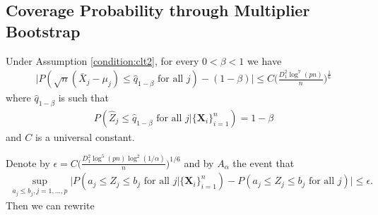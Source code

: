 \documentclass[mnsc,blindrev]{informs4} %
\begin{document}
\subsection{Coverage Probability through Multiplier Bootstrap}\label{multiplier bootstrap:unnormalized and normalized}
\begin{theorem}\label{consistency:unnormalized}
Under Assumption \ref{condition:clt2}, for every $0<\beta<1$ we have
\begin{align*}
\lvert P(\sqrt n(\bar{X}_j-\mu_j)\leq \hat q_{1-\beta}\text{ for all }j)- (1-\beta)\rvert\leq C\Big(\frac{D_1^2\log^7(pn)}{n}\Big)^{\frac{1}{6}}
\end{align*}
where $\hat q_{1-\beta}$ is such that
\begin{align*}
P(\widehat Z_j\leq \hat q_{1-\beta}\text{ for all }j\vert \{\mathbf X_i\}_{i=1}^n)=1-\beta
\end{align*}
and $C$ is a universal constant.
\end{theorem}
Denote by $\epsilon=C\Big(\frac{D_1^2\log^5(pn)\log^2(1/\alpha)}{n}\Big)^{1/6}$ and by $A_{\alpha}$ the event that
\begin{align*}
\sup_{a_j\leq b_j,j=1,\ldots,p}\Big\lvert P(a_j\leq \widehat{Z}_j\leq b_j\text{ for all }j\vert \{\mathbf X_i\}_{i=1}^n)-P(a_j\leq Z_j\leq b_j\text{ for all }j)\Big\rvert\leq \epsilon.
\end{align*}
Then we can rewrite
\end{document}
